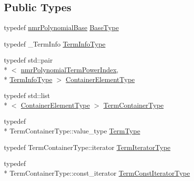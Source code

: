 \subsection*{Public Types}
\begin{DoxyCompactItemize}
\item 
typedef \hyperlink{classnmr_polynomial_base}{nmr\-Polynomial\-Base} \hyperlink{classnmr_polynomial_container_afcdfc28d7e6ba39198175c7a2cc5ed7d}{Base\-Type}
\item 
typedef \-\_\-\-Term\-Info \hyperlink{classnmr_polynomial_container_acc456652a77699f540082b3f285ac460}{Term\-Info\-Type}
\item 
typedef std\-::pair\\*
$<$ \hyperlink{classnmr_polynomial_term_power_index}{nmr\-Polynomial\-Term\-Power\-Index}, \\*
\hyperlink{classnmr_polynomial_container_acc456652a77699f540082b3f285ac460}{Term\-Info\-Type} $>$ \hyperlink{classnmr_polynomial_container_ae9c399b9034fb32315a644ebb103b4dd}{Container\-Element\-Type}
\item 
typedef std\-::list\\*
$<$ \hyperlink{classnmr_polynomial_container_ae9c399b9034fb32315a644ebb103b4dd}{Container\-Element\-Type} $>$ \hyperlink{classnmr_polynomial_container_ae9ba96ffe1b50f1cd84e6728c3a77128}{Term\-Container\-Type}
\item 
typedef \\*
Term\-Container\-Type\-::value\-\_\-type \hyperlink{classnmr_polynomial_container_a64089fefb243ca7cd6fc412083f9fa9d}{Term\-Type}
\item 
typedef Term\-Container\-Type\-::iterator \hyperlink{classnmr_polynomial_container_a276e57445d038e8a16462f47b85719a3}{Term\-Iterator\-Type}
\item 
typedef \\*
Term\-Container\-Type\-::const\-\_\-iterator \hyperlink{classnmr_polynomial_container_aba8d31506ab6a487fdc4fe2815469442}{Term\-Const\-Iterator\-Type}
\end{DoxyCompactItemize}
